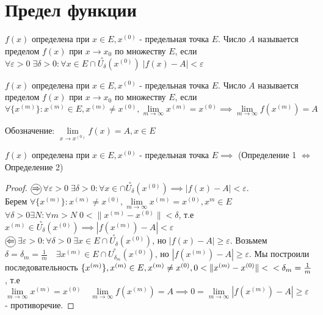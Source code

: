 \documentclass[../main.tex]{subfiles}
\begin{document}
\section{Предел функции}
\begin{definition}[Коши]
    $f(x)$ определена при $x\in E,x^{(0)}$ - предельная точка $E$. Число $A$ называется пределом $f(x)$ при $x\to x_{0}$ по множеству $E$, если $\forall \varepsilon>0\; \exists \delta> 0 : \forall x\in E\cap \overset{\circ}{U_{\delta}}(x^{(0)}) \; |f(x)-A| <\varepsilon$
\end{definition}
\begin{definition}[Гейне]
    $f(x)$ определена при $x\in E,x^{(0)}$ - предельная точка $E$. Число $A$ называется пределом $f(x)$ при $x\to x_{0}$ по множеству $E$, если $\forall \{ x^{(m)}\}: x^{(m)}\in E, x^{(m)}\neq x^{(0)}, \lim\limits_{ m   \to \infty}x^{(m)}=x^{(0)}\implies \lim\limits_{ m\to \infty}f(x^{(m)})=A  $
\end{definition}
Обозначение: $\lim\limits_{x\to x^{(0)}} f(x)=A, x\in E$

\begin{theorem}
    $f(x)$ определена при $x\in E,x^{(0)}$ - предельная точка $E\implies $ (Определение 1 $\Leftrightarrow$ Определение 2)
\end{theorem} 
\begin{proof}
    $\tcircle{$\implies$}$ $\forall \varepsilon>0 \; \exists \delta>0 : \forall x \in \cap \overset{\circ}{U_{\delta}}(x^{(0)})\implies |f(x)-A|<\varepsilon$. 
    \\Берем $\forall \{x^{(m)}\}: x^{(m)}\neq  x^{(0)}, \lim\limits_{ m \to \infty}x^{(m)}=x^{(0)},x^{m}\in E$
    \\$\forall \delta>0 \exists N : \forall m> N \; 0 < \| x^{(m)}-x^{(0)}\| <\delta$, т.е $x^{(m)}\in \overset{\circ}{U_{\delta}}(x^{(0)})\implies |f(x^{(m)})-A| < \varepsilon$
    \\ $\tcircle{$\impliedby$}$ $\exists \varepsilon>0 : \forall \delta>0 \; \exists x \in E \cap \overset{\circ}{U_{\delta}}(x^{(0)})$, но $|f(x)-A| \geqslant \varepsilon$. Возьмем $\delta = \delta_{m}=\frac{1}{m}\quad \exists x^{(m)}\in E \cap \overset{\circ}{U_{\delta_{m}}}(x^{(0)})$, но $|f(x^{(m)})-A| \geqslant \varepsilon$. 
    Мы построили последовательность $\{x^{(m)}\},x^{(m)}\in E, x^{(m)}\neq x^{(0)}, 0 < \| x^{(m)}-x^{(0)}\| <\\< \delta_{m}=\frac{1}{m}$, т.е $\lim\limits_{m\to \infty}x^{(m)}=x^{(0)} \quad \lim\limits_{m   \to \infty  } f(x^{(m)})=A\implies 0 = \lim\limits_{m   \to \infty}\left|f(x^{(m)})-A\right| \geqslant \varepsilon$ - противоречие.
\end{proof}
\end{document}
